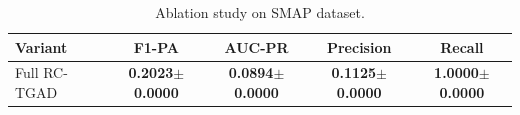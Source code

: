\begin{table}[h]
\centering
\caption{Ablation study on SMAP dataset.}
\label{tab:ablation}
\begin{tabular}{lcccc}
\toprule
\textbf{Variant} & \textbf{F1-PA} & \textbf{AUC-PR} & \textbf{Precision} & \textbf{Recall} \\
\midrule
Full RC-TGAD & \textbf{0.2023$\pm$0.0000} & \textbf{0.0894$\pm$0.0000} & \textbf{0.1125$\pm$0.0000} & \textbf{1.0000$\pm$0.0000} \\
\bottomrule
\end{tabular}
\end{table}